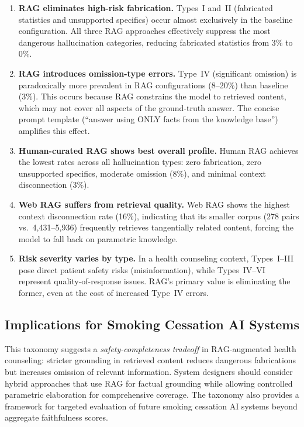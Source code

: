 \begin{enumerate}
\item \textbf{RAG eliminates high-risk fabrication.} Types~I and~II (fabricated statistics and unsupported specifics) occur almost exclusively in the baseline configuration. All three RAG approaches effectively suppress the most dangerous hallucination categories, reducing fabricated statistics from 3\% to 0\%.

\item \textbf{RAG introduces omission-type errors.} Type~IV (significant omission) is paradoxically more prevalent in RAG configurations (8--20\%) than baseline (3\%). This occurs because RAG constrains the model to retrieved content, which may not cover all aspects of the ground-truth answer. The concise prompt template (``answer using ONLY facts from the knowledge base'') amplifies this effect.

\item \textbf{Human-curated RAG shows best overall profile.} Human RAG achieves the lowest rates across all hallucination types: zero fabrication, zero unsupported specifics, moderate omission (8\%), and minimal context disconnection (3\%).

\item \textbf{Web RAG suffers from retrieval quality.} Web RAG shows the highest context disconnection rate (16\%), indicating that its smaller corpus (278 pairs vs.\ 4,431--5,936) frequently retrieves tangentially related content, forcing the model to fall back on parametric knowledge.

\item \textbf{Risk severity varies by type.} In a health counseling context, Types~I--III pose direct patient safety risks (misinformation), while Types~IV--VI represent quality-of-response issues. RAG's primary value is eliminating the former, even at the cost of increased Type~IV errors.
\end{enumerate}

\subsection{Implications for Smoking Cessation AI Systems}

This taxonomy suggests a \textit{safety-completeness tradeoff} in RAG-augmented health counseling: stricter grounding in retrieved content reduces dangerous fabrications but increases omission of relevant information. System designers should consider hybrid approaches that use RAG for factual grounding while allowing controlled parametric elaboration for comprehensive coverage. The taxonomy also provides a framework for targeted evaluation of future smoking cessation AI systems beyond aggregate faithfulness scores.

